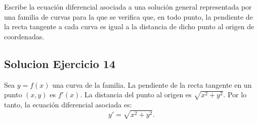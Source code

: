 \documentclass[12pt]{article}
\begin{document}
Escribe la ecuación diferencial asociada a una solución general representada por una familia de curvas para la que se verifica que, en todo punto, la pendiente de la recta tangente a cada curva es igual a la distancia de dicho punto al origen de coordenadas.

\subsection*{Solucion Ejercicio 14}

Sea $y = f(x)$ una curva de la familia. La pendiente de la recta tangente en un punto $(x, y)$ es $f'(x)$. La distancia del punto al origen es $\sqrt{x^2 + y^2}$. Por lo tanto, la ecuación diferencial asociada es:
\[y' = \sqrt{x^2 + y^2}.\]
\end{document}
